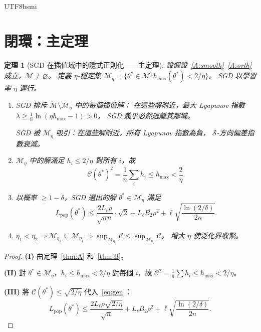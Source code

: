 \documentclass[11pt,a4paper]{article}
\newtheorem{theorem}{定理}
\theoremstyle{definition}
\newcommand{\cM}{\mathcal{M}}
\newcommand{\cS}{\mathcal{S}}
\newcommand{\cC}{\mathcal{C}}
\begin{document}
\begin{CJK}{UTF8}{bsmi}
\section{閉環：主定理}

\begin{theorem}[SGD 在插值域中的隱式正則化——主定理]\label{thm:main}
  設假設~\ref{A:smooth}--\ref{A:orth} 成立，$\cM\neq\varnothing$。
  定義 $\eta$-穩定集 $\cM_\eta=\{\theta^*\in\cM:h_{\max}(\theta^*)<2/\eta\}$。
  SGD 以學習率 $\eta$ 運行。

  \begin{enumerate}
    \item[\textbf{(I) 選擇}.]
    SGD 排斥 $\cM\setminus\cM_\eta$ 中的每個插值解：
    在這些解附近，最大 Lyapunov 指數
    $\lambda\geq\frac{1}{n}\ln(\eta h_{\max}-1)>0$，
    SGD 幾乎必然逃離其鄰域。

    SGD 被 $\cM_\eta$ 吸引：在這些解附近，所有 Lyapunov 指數為負，
    $\cS$-方向偏差指數衰減。

    \item[\textbf{(II) 複雜度控制}.]
    $\cM_\eta$ 中的解滿足 $h_i\leq 2/\eta$ 對所有 $i$，故
    \[
      \cC(\theta^*)^2=\frac{1}{n}\sum_i h_i\leq h_{\max}<\frac{2}{\eta}.
    \]

    \item[\textbf{(III) 泛化}.]
    以概率 $\geq 1-\delta$，SGD 選出的解 $\theta^*\in\cM_\eta$ 滿足
    \[
      L_{\mathrm{pop}}(\theta^*)\leq\frac{2L_\ell\rho}{\sqrt{\eta\,n}}\cdot\sqrt{2}
      +L_\ell B_2\rho^2+\overline{\ell}\sqrt{\frac{\ln(2/\delta)}{2n}}.
    \]

    \item[\textbf{(IV) 單調性}.]
    $\eta_1<\eta_2\Rightarrow\cM_{\eta_2}\subseteq\cM_{\eta_1}
    \Rightarrow\sup_{\cM_{\eta_2}}\cC\leq\sup_{\cM_{\eta_1}}\cC$。
    增大 $\eta$ 使泛化界收緊。
  \end{enumerate}
\end{theorem}

\begin{proof}
  \textbf{(I)} 由定理~\ref{thm:A} 和~\ref{thm:B}。

  \textbf{(II)} 對 $\theta^*\in\cM_\eta$，$h_i\leq h_{\max}<2/\eta$ 對每個 $i$，故
  $\cC^2=\frac{1}{n}\sum h_i\leq h_{\max}<2/\eta$。

  \textbf{(III)} 將 $\cC(\theta^*)\leq\sqrt{2/\eta}$ 代入~\eqref{eq:gen}：
  \[
    L_{\mathrm{pop}}(\theta^*)\leq\frac{2L_\ell\rho\sqrt{2/\eta}}{\sqrt{n}}+L_\ell B_2\rho^2+\overline{\ell}\sqrt{\frac{\ln(2/\delta)}{2n}}.
  \]


\end{proof}
\end{CJK}
\end{document}
